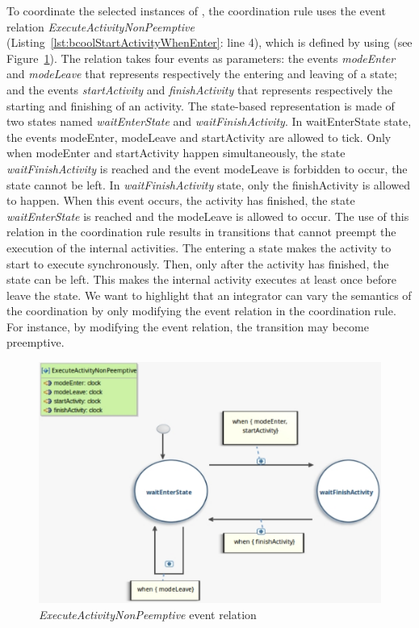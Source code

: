 To coordinate the selected instances of \dse, the coordination rule uses the event relation \emph{ExecuteActivityNonPeemptive} (Listing~\ref{lst:bcoolStartActivityWhenEnter}: line 4), which is defined by using \moccml (see Figure~\ref{fig:looprelation}). The relation takes four events as parameters: the events \emph{modeEnter} and \emph{modeLeave} that represents respectively the entering and leaving of a state; and the events \emph{startActivity} and \emph{finishActivity} that represents respectively the starting and finishing of an activity. The state-based representation is made of two states named \emph{waitEnterState} and \emph{waitFinishActivity}. In waitEnterState state, the events modeEnter, modeLeave and startActivity are allowed to tick. Only when modeEnter and startActivity happen simultaneously, the state \emph{waitFinishActivity} is reached and the event modeLeave is forbidden to occur, \ie the state cannot be left. In \emph{waitFinishActivity} state, only the finishActivity is allowed to happen. When this event occurs, \ie the activity has finished, the state \emph{waitEnterState} is reached and the modeLeave is allowed to occur. The use of this relation in the coordination rule results in transitions that cannot preempt the execution of the internal activities. The entering a state makes the activity to start to execute synchronously. Then, only after the activity has finished, the state can be left. This makes the internal activity executes at least once before leave the state. We want to highlight that an integrator can vary the semantics of the coordination by only modifying the event relation in the coordination rule. For instance, by modifying the event relation, the transition may become preemptive. 
	 
	 \begin{figure}[h]
	 	\center
	 	\includegraphics[width=.7\columnwidth]{examples/figs/ExecuteActivityNonPeemptive}
	 	\caption{\emph{ExecuteActivityNonPeemptive} event relation}
	 	\label{fig:looprelation}
	 \end{figure}
	 

